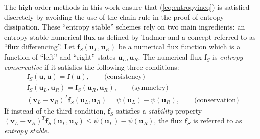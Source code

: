 \documentclass[preprint,10pt]{elsarticle}
\theoremstyle{definition}
\theoremstyle{lemma}
\theoremstyle{corollary}
\theoremstyle{theorem}
\theoremstyle{assumption}
\newcommand{\LRp}[1]{\left( #1 \right)}
\begin{document}
The high order methods in this work ensure that (\ref{eq:entropyineq}) is satisfied discretely by avoiding the use of the chain rule in the proof of entropy dissipation.  These ``entropy stable'' schemes rely on two main ingredients: an entropy stable numerical flux as defined by Tadmor \cite{tadmor1987numerical} and a concept referred to as ``flux differencing''.  %
Let $\bm{f}_S\LRp{\bm{u}_L,\bm{u}_R}$ be a numerical flux function which is a function of ``left'' and ``right'' states $\bm{u}_L,\bm{u}_R$.  
The numerical flux $\bm{f}_S$ is \textit{entropy conservative} if it satisfies the following three conditions:  
\begin{gather}
\bm{f}_S(\bm{u},\bm{u}) = \bm{f}(\bm{u}), \qquad \text{(consistency)}\\
\bm{f}_S(\bm{u}_L,\bm{u}_R) = \bm{f}_S(\bm{u}_R,\bm{u}_R), \qquad \text{(symmetry)}\nonumber\\
\LRp{\bm{v}_L-\bm{v}_R}^T\bm{f}_S(\bm{u}_L,\bm{u}_R) = \psi(\bm{u}_L) - \psi(\bm{u}_R), \qquad \text{(conservation)}\nonumber
\label{eq:esflux}
\end{gather}
If instead of the third condition, $\bm{f}_S$ satisfies a \emph{stability} property $\LRp{\bm{v}_L-\bm{v}_R}^T\bm{f}_S(\bm{u}_L,\bm{u}_R) \leq \psi(\bm{u}_L) - \psi(\bm{u}_R)$, the flux $\bm{f}_S$ is referred to as \textit{entropy stable}.  
\end{document}
